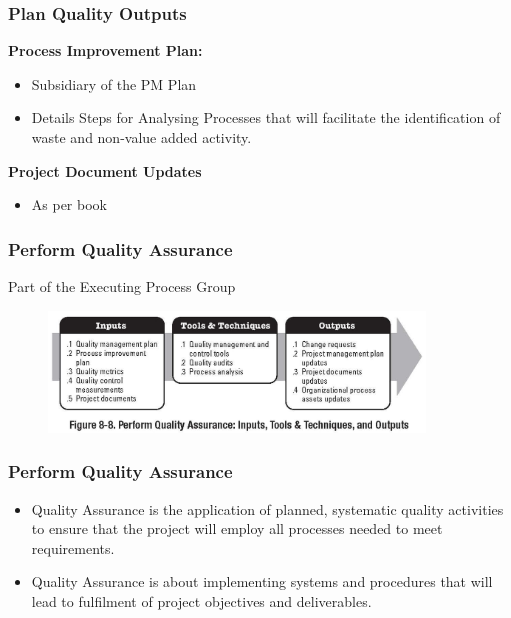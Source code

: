 \begin{frame}
\frametitle{Plan Quality \hfill Outputs}
\textbf{Process Improvement Plan:}
\begin{itemize}
	\item Subsidiary of the PM Plan
	\item Details Steps for Analysing Processes that will facilitate the identification of waste and non-value added activity.
\end{itemize}
\textbf{Project Document Updates}
\begin{itemize}
	\item As per book
\end{itemize}
\end{frame}










\begin{frame}
\frametitle{Perform Quality Assurance}
Part of the Executing Process Group
\begin{figure}
	\centering
		\includegraphics[width = 10cm]{images/Fig8-8.jpg}
	\label{fig:8-8}
\end{figure}
\end{frame}




\begin{frame}
\frametitle{Perform Quality Assurance}
\begin{itemize}
	\item Quality Assurance is the application of planned, systematic quality activities to ensure that the project will employ all processes needed to meet requirements.
	\item Quality Assurance is about implementing systems and procedures that will lead to fulfilment of project objectives and deliverables.
\end{itemize}
\end{frame}




